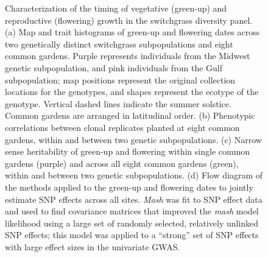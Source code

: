 \documentclass[
  9pt,
  twocolumn,
  twoside]{pnas-new}
\begin{document}
\begin{figure}


\caption{\label{fig-map}Characterization of the timing of vegetative
(green-up) and reproductive (flowering) growth in the switchgrass
diversity panel. (a) Map and trait histograms of green-up and flowering
dates across two genetically distinct switchgrass subpopulations and
eight common gardens. Purple represents individuals from the Midwest
genetic subpopulation, and pink individuals from the Gulf subpopulation;
map positions represent the original collection locations for the
genotypes, and shapes represent the ecotype of the genotype. Vertical
dashed lines indicate the summer solstice. Common gardens are arranged
in latitudinal order. (b) Phenotypic correlations between clonal
replicates planted at eight common gardens, within and between two
genetic subpopulations. (c) Narrow sense heritability of green-up and
flowering within single common gardens (purple) and across all eight
common gardens (green), within and between two genetic subpopulations.
(d) Flow diagram of the methods applied to the green-up and flowering
dates to jointly estimate SNP effects across all sites. \emph{Mash} was
fit to SNP effect data and used to find covariance matrices that
improved the \emph{mash} model likelihood using a large set of randomly
selected, relatively unlinked SNP effects; this model was applied to a
``strong'' set of SNP effects with large effect sizes in the univariate
GWAS.}

\end{figure}%
\end{document}

